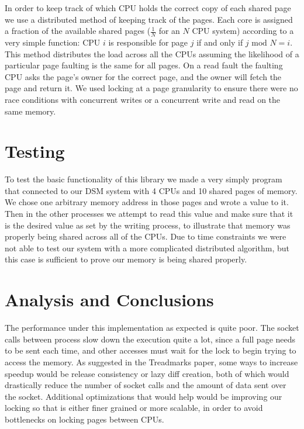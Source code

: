 \documentclass[a4paper,10pt]{article}
\begin{document}
In order to keep track of which CPU holds the correct copy of each shared page
we use a distributed method of keeping track of the pages.  Each core is
assigned a fraction of the available shared pages ($\frac{1}{N}$ for an $N$
CPU system) according to a very simple function:  CPU $i$ is responsible for
page $j$ if and only if $j \textrm{ mod } N = i$.  This method distributes the
load across all the CPUs assuming the likelihood of a particular page faulting
is the same for all pages.  On a read fault the faulting CPU asks the page's
owner for the correct page, and the owner will fetch the page and return it. 
We used locking at a page granularity to ensure there were no race conditions
with concurrent writes or a concurrent write and read on the same memory.

\section{Testing}
To test the basic functionality of this library we made a very simply program
that connected to our DSM system with 4 CPUs and 10 shared pages of memory.  We
chose one arbitrary memory address in those pages and wrote a value to it. 
Then in the other processes we attempt to read this value and make sure that it
is the desired value as set by the writing process, to illustrate that memory
was properly being shared across all of the CPUs.  Due to time constraints we
were not able to test our system with a more complicated distributed algorithm,
but this case is sufficient to prove our memory is being shared properly.
\section{Analysis and Conclusions}
The performance under this implementation as expected is quite poor.  The
socket calls between process slow down the execution quite a lot, since a full
page needs to be sent each time, and other accesses must wait for the lock to
begin trying to access the memory.  As suggested in the Treadmarks paper, some
ways to increase speedup would be release consistency or lazy diff creation,
both of which would drastically reduce the number of socket calls and the
amount of data sent over the socket.  Additional optimizations that would help
would be improving our locking so that is either finer grained or more
scalable, in order to avoid bottlenecks on locking pages between CPUs.
\end{document}

